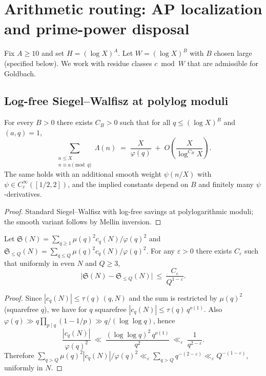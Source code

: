 \section{Arithmetic routing: AP localization and prime-power disposal}\label{sec:AP}

Fix $A\ge 10$ and set $H=(\log X)^A$. Let $W=(\log X)^B$ with $B$ chosen large (specified below).
We work with residue classes $c\bmod W$ that are admissible for Goldbach.

\subsection{Log-free Siegel–Walfisz at polylog moduli}

\begin{lemma}\label{lem:SW}
For every $B>0$ there exists $C_B>0$ such that for all $q\le (\log X)^B$ and $(a,q)=1$,
\[
\sum_{\substack{n\le X\\ n\equiv a\!\!\!\pmod q}}\!\!\Lambda(n)
\;=\;\frac{X}{\varphi(q)}\;+\;O\!\left(\frac{X}{\log^{C_B}\!X}\right).
\]
The same holds with an additional smooth weight $\psi(n/X)$ with $\psi\in C_c^\infty([1/2,2])$, and the implied constants depend on $B$ and finitely many $\psi$-derivatives.
\end{lemma}

\begin{proof}
Standard Siegel--Walfisz with log-free savings at polylogarithmic moduli; the smooth variant follows by Mellin inversion.
\end{proof}

\begin{proposition}\label{prop:truncation-proof}
Let $\mathfrak S(N)=\sum_{q\ge 1}\mu(q)^2 c_q(N)/\varphi(q)^2$ and $\mathfrak S_{\le Q}(N)=\sum_{q\le Q}\mu(q)^2 c_q(N)/\varphi(q)^2$.
For any $\varepsilon>0$ there exists $C_\varepsilon$ such that uniformly in even $N$ and $Q\ge 3$,
\[
\big|\mathfrak S(N)-\mathfrak S_{\le Q}(N)\big|\ \le\ \frac{C_\varepsilon}{Q^{1-\varepsilon}}.
\]
\end{proposition}
\begin{proof}
Since $|c_q(N)|\le \tau(q)\,(q,N)$ and the sum is restricted by $\mu(q)^2$ (squarefree $q$), we have for $q$ squarefree
$|c_q(N)|\le \tau(q)\,q^{o(1)}$. Also $\varphi(q)\gg q \prod_{p\mid q}(1-1/p)\gg q/(\log\log q)$, hence
\[
\frac{|c_q(N)|}{\varphi(q)^2}\ \ll\ \frac{(\log\log q)^2\,q^{o(1)}}{q^2}\ \ll_\varepsilon\ \frac{1}{q^{2-\varepsilon}}.
\]
Therefore $\sum_{q>Q}\mu(q)^2 |c_q(N)|/\varphi(q)^2 \ll_\varepsilon \sum_{q>Q} q^{-(2-\varepsilon)}\ll_\varepsilon Q^{-(1-\varepsilon)}$, uniformly in $N$.
\end{proof}



